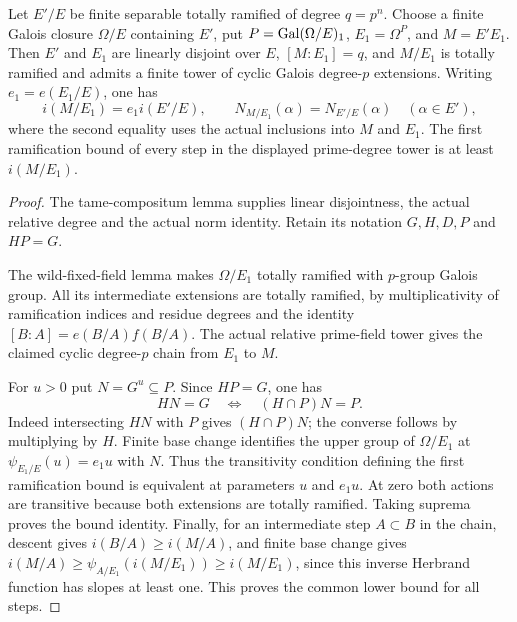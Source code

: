 \begin{lemma}
\label{fw:nonnormal-tame-norm-reduction}
\notready
Let $E'/E$ be finite separable totally ramified of degree $q=p^n$.
Choose a finite Galois closure $\Omega/E$ containing $E'$, put
$P=\operatorname{Gal}(\Omega/E)_1$, $E_1=\Omega^P$, and $M=E'E_1$.
Then $E'$ and $E_1$ are linearly disjoint over $E$,
$[M:E_1]=q$, and $M/E_1$ is totally ramified and admits a finite
tower of cyclic Galois degree-$p$ extensions. Writing
$e_1=e(E_1/E)$, one has
\[
 i(M/E_1)=e_1 i(E'/E),\qquad
 N_{M/E_1}(\alpha)=N_{E'/E}(\alpha)\quad(\alpha\in E'),
\]
where the second equality uses the actual inclusions into $M$ and
$E_1$. The first ramification bound of every step in the displayed
prime-degree tower is at least $i(M/E_1)$.
\end{lemma}
\begin{proof}
The tame-compositum lemma supplies linear disjointness, the actual
relative degree and the actual norm identity. Retain its notation
$G,H,D,P$ and $HP=G$.

The wild-fixed-field lemma makes $\Omega/E_1$ totally ramified with
$p$-group Galois group. All its intermediate extensions are
totally ramified, by multiplicativity of ramification indices
and residue degrees and the identity $[B:A]=e(B/A)f(B/A)$.
The actual relative prime-field tower gives the claimed cyclic
degree-$p$ chain from $E_1$ to $M$.

For $u>0$ put $N=G^u\subseteq P$. Since $HP=G$, one has
\[
 HN=G\quad\Longleftrightarrow\quad (H\cap P)N=P.
\]
Indeed intersecting $HN$ with $P$ gives $(H\cap P)N$; the
converse follows by multiplying by $H$. Finite base change
identifies the upper group of $\Omega/E_1$ at
$\psi_{E_1/E}(u)=e_1u$ with $N$. Thus the transitivity condition
defining the first ramification bound is equivalent at parameters
$u$ and $e_1u$. At zero both actions are transitive because both
extensions are totally ramified. Taking suprema proves the bound
identity. Finally, for an intermediate step $A\subset B$ in the
chain, descent gives $i(B/A)\geq i(M/A)$, and finite base change
gives
$i(M/A)\geq\psi_{A/E_1}(i(M/E_1))\geq i(M/E_1)$, since this inverse
Herbrand function has slopes at least one. This proves the common
lower bound for all steps.
\end{proof}

